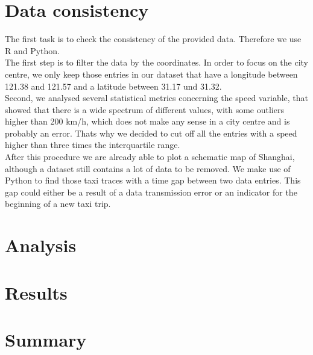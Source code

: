 \documentclass[11pt,conference,a4paper,onecolumn,romanappendices]{IEEEtran}
\begin{document}
\section{Data consistency}
\begin{comment} The main problem is to find routes, that a bigger number of taxi trips have in common. Therefore we could concentrate on taxi routes with a close place of departure and/or a close destination. \end{comment}
The first task is to check the consistency of the provided data. Therefore we use R and Python. \\
The first step is to filter the data by the coordinates. In order to focus on the city centre, we only keep those entries in our dataset that have a longitude between 121.38 and 121.57 and a latitude between 31.17 und 31.32. \\
Second, we analysed several statistical metrics concerning the speed variable, that showed that there is a wide spectrum of different values, with some outliers higher than 200 km/h, which does not make any sense in a city centre and is probably an error. Thats why we decided to cut off all the entries with a speed higher than three times the interquartile range. \\
After this procedure we are already able to plot a schematic map of Shanghai, although a dataset still contains a lot of data to be removed. We make use of Python to find those taxi traces with a time gap between two data entries. This gap could either be a result of a data transmission error or an indicator for the beginning of a new taxi trip.
\section{Analysis}
\section{Results}
\section{Summary}

\newpage


\end{document}
